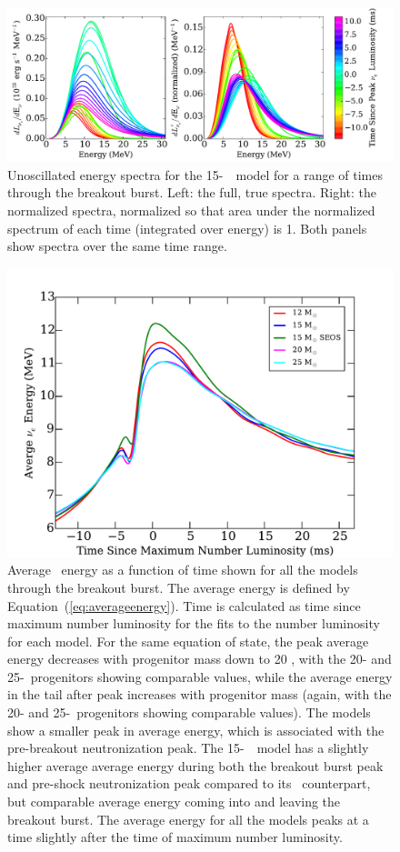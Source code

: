 \begin{figure}[h]
\centering
\centerline{\includegraphics[width=0.95\linewidth]{nue_energy_spectrum_time.pdf}}
\caption{\label{fig:energyspectrum}Unoscillated energy spectra for the 15-\Msol\
  \ls\ model for a range of  times through the breakout burst.  
  Left: the
  full, true spectra.  Right: the normalized spectra, normalized so
  that area under the normalized spectrum of each time (integrated
  over energy) is 1.  Both panels show spectra over the same time range.}
\end{figure}
\begin{figure}[h]
\centering
\includegraphics[width=0.65\linewidth]{nue_avg_energy.pdf}
\caption{\label{fig:avgenergy}Average \nue\ energy as a function of
time shown for all the models through the breakout burst. The average
energy is defined by Equation~(\ref{eq:averageenergy}).  Time is
calculated as time since maximum number luminosity for the fits to the
number luminosity for each model.  For the same 
equation of state, the peak average energy decreases with progenitor
mass down to 20 \Msol, with the 20- and 25-\Msol\ progenitors
showing comparable values, while the average energy in the tail after 
peak increases with progenitor mass (again, with the 20-  and 
25-\Msol\ progenitors
showing comparable values).
The models show a smaller peak in average energy, which is 
associated with the 
pre-breakout neutronization peak. 
The 15-\Msol\ \shen\ model has a slightly higher average
average energy during both the breakout burst peak and pre-shock
neutronization peak compared to its \ls\
counterpart, but comparable average energy coming into and leaving the
breakout burst.  The average energy for all the models peaks at a time
slightly after the
time of maximum number luminosity.} 
\end{figure}

